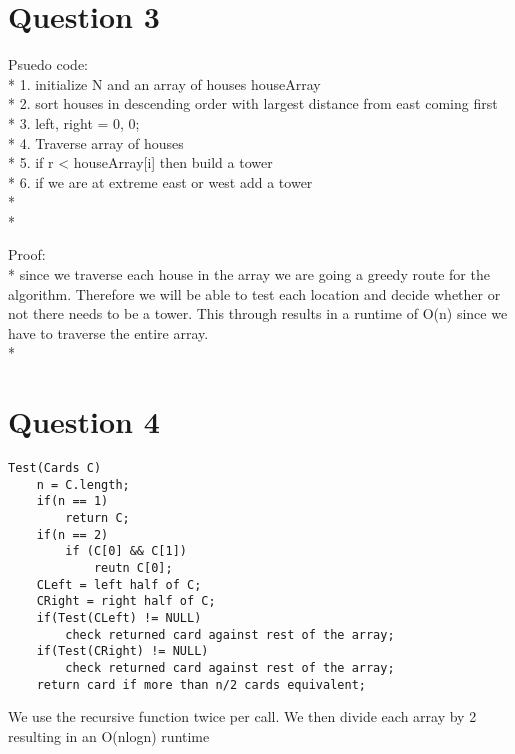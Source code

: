 \documentclass[11pt]{book}
\begin{document}
\section*{Question 3}
Psuedo code:\\*
1. initialize N and an array of houses houseArray\\*
2. sort houses in descending order with largest distance from east coming first\\* 
3. left, right = 0, 0;\\*
4. Traverse array of houses\\*
5. if r < houseArray[i] then build a tower\\*
6. if we are at extreme east or west add a tower\\*\\*

Proof:\\*
since we traverse each house in the array we are going a greedy
route for the algorithm. Therefore we will be able to test each
location and decide whether or not there needs to be a tower. This
through results in a runtime of O(n) since we have to traverse the
entire array.\\*

\section*{Question 4}
\begin{lstlisting}
Test(Cards C)
	n = C.length;
	if(n == 1)
		return C;
	if(n == 2)
		if (C[0] && C[1])
			reutn C[0];
	CLeft = left half of C;
	CRight = right half of C;
	if(Test(CLeft) != NULL)
		check returned card against rest of the array;
	if(Test(CRight) != NULL)
		check returned card against rest of the array;
	return card if more than n/2 cards equivalent;
\end{lstlisting}

We use the recursive function twice per call. We then divide each 
array by 2 resulting in an O(nlogn) runtime
\end{document}
